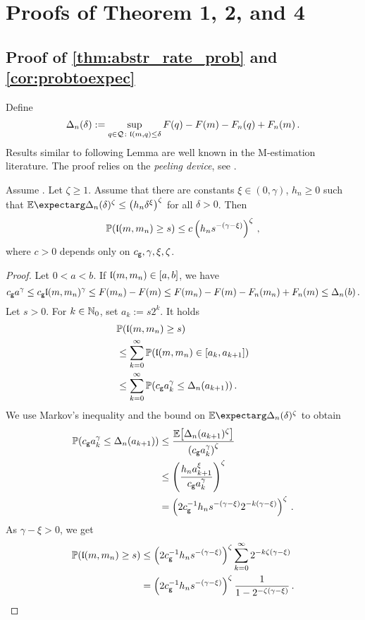 %
%
\section{Proofs of Theorem 1, 2, and 4}\label{app:proofs:1and2}
%
%
%
%
\subsection{Proof of \autoref{thm:abstr_rate_prob} and \autoref{cor:probtoexpec}}
%
%
%
Define
\begin{equation*}
	\Delta_n(\delta) := \sup_{q\in\mathcal{Q}\colon \mathfrak{l}(m,q)\leq \delta} F(q)-F(m)-F_n(q)+F_n(m)
	\, .
\end{equation*}
%
Results similar to following Lemma are well known in the M-estimation literature. The proof relies on the \textit{peeling device}, see \cite{geer00}.
%
\begin{lemma}\label{lmm:weak:argmin}	
	Assume . Let $\zeta \geq 1$. Assume that there are constants $\xi\in(0,\gamma)$, $h_n\geq 0$ such that
	$\Ex{\Delta_n(\delta)^\zeta} \leq \br{h_n \delta^\xi}^\zeta$	for all $\delta>0$. Then
	\begin{equation*}
		\mathbb{P}\mathopen{}\left( \mathfrak{l}(m,m_n) \geq s \right)\mathclose{}
		\leq
		c \left( h_n s^{-(\gamma-\xi)} \right)^\zeta
		\, ,
	\end{equation*}
	where $c > 0$ depends only on $c_{\mathsf{g}}, \gamma, \xi, \zeta$.
\end{lemma}
%
\begin{proof}
	Let $0 < a < b$.
	If $\mathfrak{l}(m, m_n) \in [a,b]$, we have
	\begin{equation*}
		c_{\mathsf{g}} a^\gamma 
		\leq 
		c_{\mathsf{g}} \mathfrak{l}(m,m_n)^\gamma
		\leq 
		F(m_n)-F(m)
		\leq 
		F(m_n)-F(m)-F_n(m_n)+F_n(m)
		\leq 
		\Delta_n(b)
		\, .
	\end{equation*}
	Let $s>0$. 
	For $k\in \mathbb{N}_0$, set $a_k := s 2^{k}$. It holds
	\begin{align*}
		&\mathbb{P}\mathopen{}\left( \mathfrak{l}(m,m_n) \geq s \right)\mathclose{}
		\\&\leq 
		\sum_{k=0}^{\infty}\mathbb{P}\mathopen{}\left( \mathfrak{l}(m, m_n) \in [a_k, a_{k+1}] \right)\mathclose{}
		\\&\leq 
		\sum_{k=0}^{\infty} \mathbb{P}\mathopen{}\left( c_{\mathsf{g}} a_k^\gamma \leq \Delta_n(a_{k+1}) \right)\mathclose{}
		\, .
	\end{align*}
	We use Markov's inequality and the bound on $\Ex{\Delta_n(\delta)^\zeta}$ to obtain
	\begin{align*}
		\mathbb{P}\mathopen{}\left( c_{\mathsf{g}} a_k^\gamma \leq \Delta_n(a_{k+1}) \right)\mathclose{}
		&\leq
		\frac{\mathbb{E}\!\left[  \Delta_n(a_{k+1})^\zeta \right]}{\left( c_{\mathsf{g}} a_k^\gamma \right)^\zeta} 
		\\&\leq
		\left( \frac{h_n a_{k+1}^\xi}{c_{\mathsf{g}} a_k^\gamma} \right)^\zeta
		\\&=
		\left( 2 c_{\mathsf{g}}^{-1} h_n s^{-(\gamma-\xi)} 2^{-k(\gamma-\xi)} \right)^\zeta
		\, .
	\end{align*}
	As $\gamma-\xi>0$, we get 
	\begin{align*}
		\mathbb{P}\mathopen{}\left( \mathfrak{l}(m,m_n) \geq s \right)\mathclose{}
		&\leq
		\left( 2 c_{\mathsf{g}}^{-1} h_n s^{-(\gamma-\xi)} \right)^\zeta \sum_{k=0}^\infty 2^{-k\zeta(\gamma-\xi)}
		\\&=
		\left( 2 c_{\mathsf{g}}^{-1} h_n s^{-(\gamma-\xi)} \right)^\zeta \frac{1}{1-2^{-\zeta(\gamma-\xi)}}
		\, .
	\end{align*}
\end{proof}
